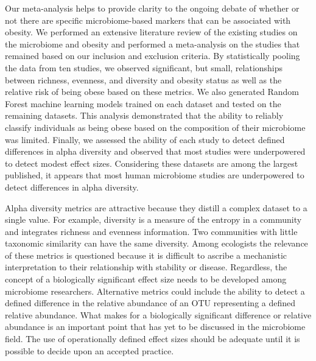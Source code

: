 \documentclass[12pt,]{article}
\begin{document}
Our meta-analysis helps to provide clarity to the ongoing debate of
whether or not there are specific microbiome-based markers that can be
associated with obesity. We performed an extensive literature review of
the existing studies on the microbiome and obesity and performed a
meta-analysis on the studies that remained based on our inclusion and
exclusion criteria. By statistically pooling the data from ten studies,
we observed significant, but small, relationships between richness,
evenness, and diversity and obesity status as well as the relative risk
of being obese based on these metrics. We also generated Random Forest
machine learning models trained on each dataset and tested on the
remaining datasets. This analysis demonstrated that the ability to
reliably classify individuals as being obese based on the composition of
their microbiome was limited. Finally, we assessed the ability of each
study to detect defined differences in alpha diversity and observed that
most studies were underpowered to detect modest effect sizes.
Considering these datasets are among the largest published, it appears
that most human microbiome studies are underpowered to detect
differences in alpha diversity.

Alpha diversity metrics are attractive because they distill a complex
dataset to a single value. For example, diversity is a measure of the
entropy in a community and integrates richness and evenness information.
Two communities with little taxonomic similarity can have the same
diversity. Among ecologists the relevance of these metrics is questioned
because it is difficult to ascribe a mechanistic interpretation to their
relationship with stability or disease. Regardless, the concept of a
biologically significant effect size needs to be developed among
microbiome researchers. Alternative metrics could include the ability to
detect a defined difference in the relative abundance of an OTU
representing a defined relative abundance. What makes for a biologically
significant difference or relative abundance is an important point that
has yet to be discussed in the microbiome field. The use of
operationally defined effect sizes should be adequate until it is
possible to decide upon an accepted practice.
\end{document}
